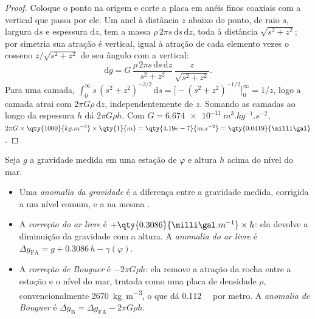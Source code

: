 \begin{proof}
Coloque o ponto na origem e corte a placa em anéis finos coaxiais com a
vertical que passa por ele. Um anel à distância $z$ abaixo do ponto, de raio
$s$, largura $\mathrm ds$ e espessura $\mathrm dz$, tem a massa
$\rho\,2\pi s\,\mathrm ds\,\mathrm dz$, toda à distância $\sqrt{s^2 + z^2}$;
por simetria sua atração é vertical, igual à atração de cada
elemento vezes o cosseno $z/\sqrt{s^2+z^2}$ de seu ângulo com a vertical:
\[
  \mathrm dg = G\,\frac{\rho\,2\pi s\,\mathrm ds\,\mathrm dz}{s^2 + z^2}\,
  \frac{z}{\sqrt{s^2 + z^2}} .
\]
Para uma camada, $\int_0^\infty s\,(s^2 + z^2)^{-3/2}\,\mathrm ds =
\bigl[-(s^2 + z^2)^{-1/2}\bigr]_0^\infty = 1/z$, logo a camada atrai com
$2\pi G\rho\,\mathrm dz$, independentemente de $z$. Somando as camadas ao longo da
espessura $h$ dá $2\pi G\rho h$. Com $G = \qty{6.674e-11}{m^3.kg^{-1}.s^{-2}}$,
$2\pi G\times\qty{1000}{kg.m^{-3}}\times\qty{1}{m} = \qty{4.19e-7}{m.s^{-2}} =
\qty{0.0419}{\milli\gal}$.
\end{proof}

\begin{definition}\label{def:b1:isostasy-gravity:anomalies}
Seja $g$ a gravidade medida em uma estação de  $\varphi$ e altura $h$
acima do nível do mar.
\begin{itemize}
  \item Uma \emph{anomalia da gravidade} é a diferença
        entre a gravidade medida, corrigida a um nível comum, e a
         na mesma .
  \item A \emph{correção do ar livre} é
        $+\qty{0.3086}{\milli\gal.m^{-1}}\times h$: ela devolve a diminuição
        da gravidade com a altura. A \emph{anomalia do ar
        livre} é
        $\Delta g_{\mathrm{FA}} = g + 0.3086\,h - \gamma(\varphi)$.
  \item A \emph{correção de Bouguer} é $-2\pi G\rho h$:
        ela remove a atração da rocha entre a estação e o nível do mar, tratada como uma placa de
        densidade $\rho$, convencionalmente \qty{2670}{kg.m^{-3}}, o que dá \qty{0.112}{\milli\gal} por metro.
        A \emph{anomalia de Bouguer} é
        $\Delta g_{\mathrm B} = \Delta g_{\mathrm{FA}} - 2\pi G\rho h$.
\end{itemize}
\end{definition}

